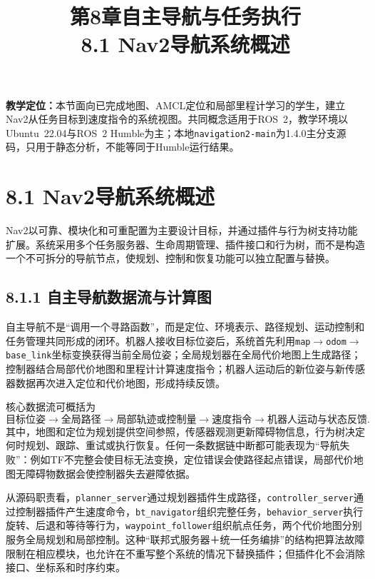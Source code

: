 \documentclass[UTF8,zihao=-4]{ctexart}
\title{第8章自主导航与任务执行\\\large 8.1 Nav2导航系统概述}
\author{}
\date{}
\begin{document}
\maketitle

\noindent\textbf{教学定位：}本节面向已完成地图、AMCL定位和局部里程计学习的学生，建立Nav2从任务目标到速度指令的系统视图。共同概念适用于ROS~2，教学环境以Ubuntu~22.04与ROS~2 Humble为主；本地\texttt{navigation2-main}为1.4.0主分支源码，只用于静态分析，不能等同于Humble运行结果。

\section*{8.1 Nav2导航系统概述}

Nav2以可靠、模块化和可重配置为主要设计目标，并通过插件与行为树支持功能扩展\cite{macenski2020nav2}。系统采用多个任务服务器、生命周期管理、插件接口和行为树，而不是构造一个不可拆分的导航节点，使规划、控制和恢复功能可以独立配置与替换。

\subsection*{8.1.1 自主导航数据流与计算图}

自主导航不是“调用一个寻路函数”，而是定位、环境表示、路径规划、运动控制和任务管理共同形成的闭环。机器人接收目标位姿后，系统首先利用\texttt{map}$\rightarrow$\texttt{odom}$\rightarrow$\texttt{base\_link}坐标变换获得当前全局位姿；全局规划器在全局代价地图上生成路径；控制器结合局部代价地图和里程计计算速度指令；机器人运动后的新位姿与新传感器数据再次进入定位和代价地图，形成持续反馈。

核心数据流可概括为
\begin{equation}
  \text{目标位姿}
  \rightarrow \text{全局路径}
  \rightarrow \text{局部轨迹或控制量}
  \rightarrow \text{速度指令}
  \rightarrow \text{机器人运动与状态反馈}.
  \label{eq:nav2-data-flow}
\end{equation}
其中，地图和定位为规划提供空间参照，传感器观测更新障碍物信息，行为树决定何时规划、跟踪、重试或执行恢复。任何一条数据链中断都可能表现为“导航失败”：例如TF不完整会使目标无法变换，定位错误会使路径起点错误，局部代价地图无障碍物数据会使控制器失去避障依据。

从源码职责看，\texttt{planner\_server}通过规划器插件生成路径，\texttt{controller\_server}通过控制器插件产生速度命令，\texttt{bt\_navigator}组织完整任务，\texttt{behavior\_server}执行旋转、后退和等待等行为，\texttt{waypoint\_follower}组织航点任务，两个代价地图分别服务全局规划和局部控制\cite{navigation2source,macenski2020nav2}。这种“联邦式服务器＋统一任务编排”的结构把算法故障限制在相应模块，也允许在不重写整个系统的情况下替换插件；但插件化不会消除接口、坐标系和时序约束。
\end{document}
